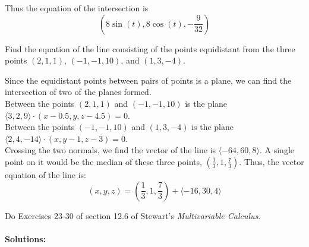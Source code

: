 \documentclass[12pt]{exam}
\begin{document}
\begin{questions}
\begin{solution}
		Thus the equation of the intersection is 
		\[\boxed{(8\sin(t), 8\cos(t), -\frac{9}{32})} \tag*{\qed}\]
	\end{solution}
\clearpage
\question Find the equation of the line consisting of the points equidistant 
	from the three points $(2, 1, 1)$, $(-1, -1, 10)$, and $(1, 3, -4)$.
	\begin{solution}
		Since the equidistant points between pairs of points is a plane, we can find the intersection of two of the planes formed. \\
		Between the points $(2,1,1)$ and $(-1,-1,10)$ is the plane $\langle 3, 2, 9 \rangle \cdot (x - 0.5, y, z - 4.5) = 0$. \\
		Between the points $(-1, -1, 10)$ and $(1, 3, -4)$ is the plane $\langle 2, 4, -14 \rangle \cdot (x, y - 1, z - 3) = 0$. \\
		Crossing the two normals, we find the vector of the line is $ \langle -64, 60, 8 \rangle $. A single point on it would be the median of these three points, $(\frac{1}{3}, 1, \frac{7}{3})$. Thus, the vector equation of the line is:
		\[ \boxed{(x, y, z) = \left(\frac{1}{3}, 1, \frac{7}{3}\right) + \langle -16, 30, 4 \rangle} \tag*{\qed}\]
	\end{solution}
\clearpage
\question 
\clearpage
\question Do Exercises 23-30 of section 12.6 of Stewart’s \textit{Multivariable Calculus}.
	\\\\\textbf{Solutions:}
	\begin{questions}
		\setcounter{question}{22}
		\question 
	\end{questions}
\clearpage
\setcounter{question}{6}
\question
\end{questions}
\end{document}
